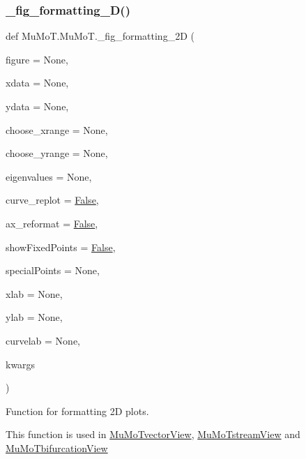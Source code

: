 \subsubsection{\texorpdfstring{\+\_\+fig\+\_\+formatting\+\_\+D()}{\_fig\_formatting\_2D()}}
{\footnotesize\ttfamily def Mu\+Mo\+T.\+Mu\+Mo\+T.\+\_\+fig\+\_\+formatting\+\_\+2D (\begin{DoxyParamCaption}\item[{}]{figure = {\ttfamily None},  }\item[{}]{xdata = {\ttfamily None},  }\item[{}]{ydata = {\ttfamily None},  }\item[{}]{choose\+\_\+xrange = {\ttfamily None},  }\item[{}]{choose\+\_\+yrange = {\ttfamily None},  }\item[{}]{eigenvalues = {\ttfamily None},  }\item[{}]{curve\+\_\+replot = {\ttfamily \hyperlink{namespace_mu_mo_t_1_1_mu_mo_t_a36cde68b055f3f2ee671020af4ccf4e2}{False}},  }\item[{}]{ax\+\_\+reformat = {\ttfamily \hyperlink{namespace_mu_mo_t_1_1_mu_mo_t_a36cde68b055f3f2ee671020af4ccf4e2}{False}},  }\item[{}]{show\+Fixed\+Points = {\ttfamily \hyperlink{namespace_mu_mo_t_1_1_mu_mo_t_a36cde68b055f3f2ee671020af4ccf4e2}{False}},  }\item[{}]{special\+Points = {\ttfamily None},  }\item[{}]{xlab = {\ttfamily None},  }\item[{}]{ylab = {\ttfamily None},  }\item[{}]{curvelab = {\ttfamily None},  }\item[{}]{kwargs }\end{DoxyParamCaption})\hspace{0.3cm}{\ttfamily [private]}}



Function for formatting 2D plots. 

This function is used in \hyperlink{class_mu_mo_t_1_1_mu_mo_t_1_1_mu_mo_tvector_view}{Mu\+Mo\+Tvector\+View}, \hyperlink{class_mu_mo_t_1_1_mu_mo_t_1_1_mu_mo_tstream_view}{Mu\+Mo\+Tstream\+View} and \hyperlink{class_mu_mo_t_1_1_mu_mo_t_1_1_mu_mo_tbifurcation_view}{Mu\+Mo\+Tbifurcation\+View} \mbox{\label{namespace_mu_mo_t_1_1_mu_mo_t_a2748e3bdfa70e8269681135256afc7b5}} 
